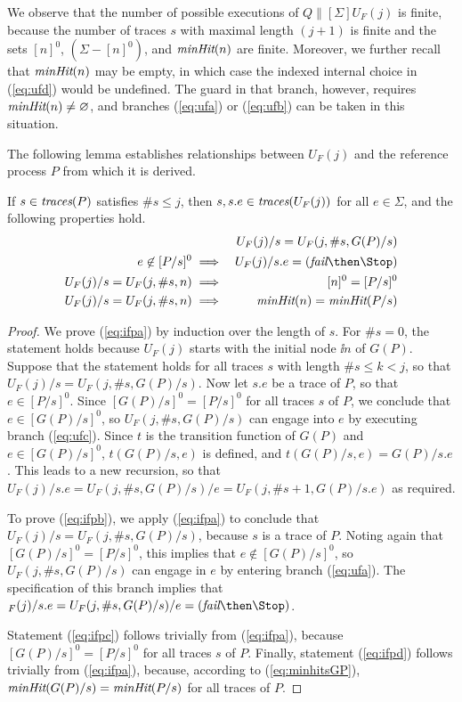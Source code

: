 We observe that the number of possible executions of $Q\parallel[\Sigma]
U_F(j)$ is finite, because the number of traces $s$ with maximal length
$(j+1)$ is finite and the sets $[n]^0$, $(\Sigma - [n]^0)$, and $\text{\it minHit}(n)$
are finite. Moreover, we further recall that $\text{\it minHit}(n)$ may be empty, in
which case the indexed internal choice in (\ref{eq:ufd}) would be undefined.
The guard in that branch, however, requires $\text{\it minHit}(n)\neq\varnothing$, and
branches (\ref{eq:ufa}) or (\ref{eq:ufb}) can be taken in this situation.

The following lemma establishes relationships between $U_F(j)$ and the
reference process $P$ from which it is derived.

\begin{lemma}\label{lemma:ufproperties}
If $s\in\text{\it traces}(P)$ satisfies $\#s\le j$, then
$s, s.e\in\text{\it traces}(U_F(j))$ for all $e\in\Sigma$, and the following properties hold.
\begin{eqnarray}
\label{eq:ifpa}
  &  & U_F(j)/s = U_F(j,\#s,G(P)/s)
\\
\label{eq:ifpb}
e\not\in [P/s]^0 & \implies & U_F(j)/s.e = (\efail\then\Stop)
\\
\label{eq:ifpc}
U_F(j)/s = U_F(j,\# s,n)  & \implies & [n]^0 = [P/s]^0
\\
\label{eq:ifpd}
U_F(j)/s = U_F(j,\# s,n)  & \implies & \minhits(n) = \minhits(P/s)
\end{eqnarray}
\end{lemma}
\begin{proof}
We prove (\ref{eq:ifpa}) by induction over the length of $s$. For $\#s = 0$,
the statement holds because $U_F(j)$ starts with the initial node $\ii n$ of
$G(P)$. Suppose that the statement holds for all traces $s$ with length $\# s
\le k < j$, so that $U_F(j)/s = U_F(j,\#s,G(P)/s)$. Now let $s.e$ be a trace
of $P$, so that $e\in [P/s]^0$. Since $[G(P)/s]^0 = [P/s]^0$ for all traces
$s$ of $P$, we conclude that $e\in  [G(P)/s]^0$, so $U_F(j,\#s,G(P)/s)$ can
engage into $e$ by executing branch (\ref{eq:ufc}). Since $t$ is the
transition function of $G(P)$ and $e\in [G(P)/s]^0$, $t(G(P)/s,e)$ is
defined, and $t(G(P)/s,e) = G(P)/s.e$. This leads to a new recursion, so that
$U_F(j)/s.e = U_F(j,\#s,G(P)/s)/e = U_F(j,\#s+1,G(P)/s.e)$ as required.

To prove (\ref{eq:ifpb}), we apply (\ref{eq:ifpa}) to conclude that $U_F(j)/s
= U_F(j,\#s,G(P)/s)$, because $s$ is a trace of $P$. Noting again that
$[G(P)/s]^0 = [P/s]^0$, this implies that $e\not\in [G(P)/s]^0$, so
$U_F(j,\#s,G(P)/s)$ can engage in $e$ by entering branch (\ref{eq:ufa}). The
specification of this branch implies that $_F(j)/s.e = U_F(j,\#s,G(P)/s)/e =
(\efail\then\Stop)$.

Statement (\ref{eq:ifpc}) follows trivially from (\ref{eq:ifpa}), because
$[G(P)/s]^0 = [P/s]^0$ for all traces $s$ of $P$. Finally, statement
(\ref{eq:ifpd}) follows trivially from (\ref{eq:ifpa}), because, according to
(\ref{eq:minhitsGP}), $\text{\it minHit}(G(P)/s) = \text{\it minHit}(P/s)$ for all traces of
$P$. \xbox
\end{proof}
